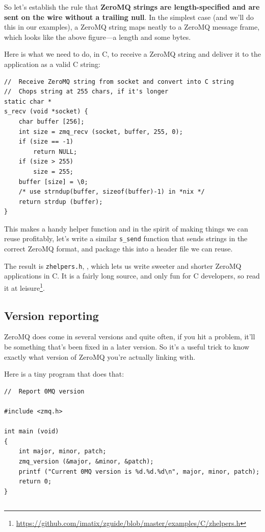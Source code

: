 So let's establish the rule that \textbf{ZeroMQ strings are length-specified and are
sent on the wire without a trailing null}. In the simplest case (and we'll do
this in our examples), a ZeroMQ string maps neatly to a ZeroMQ message frame,
which looks like the above figure—a length and some bytes.

Here is what we need to do, in C, to receive a ZeroMQ string and deliver it to
the application as a valid C string:
\begin{verbatim}
//  Receive ZeroMQ string from socket and convert into C string
//  Chops string at 255 chars, if it's longer
static char *
s_recv (void *socket) {
    char buffer [256];
    int size = zmq_recv (socket, buffer, 255, 0);
    if (size == -1)
        return NULL;
    if (size > 255)
        size = 255;
    buffer [size] = \0;
    /* use strndup(buffer, sizeof(buffer)-1) in *nix */
    return strdup (buffer);
}
\end{verbatim}
This makes a handy helper function and in the spirit of making things we can
reuse profitably, let's write a similar \Verb|s_send| function that sends strings in
the correct ZeroMQ format, and package this into a header file we can reuse.

The result is \Verb|zhelpers.h|, , which lets us write sweeter and shorter ZeroMQ
applications in C. It is a fairly long source, and only fun for C developers,
so read it at leisure\footnote{\url{https://github.com/imatix/zguide/blob/master/examples/C/zhelpers.h}}.

\subsection{Version reporting}

ZeroMQ does come in several versions and quite often, if you hit a problem,
it'll be something that's been fixed in a later version. So it's a useful trick
to know exactly what version of ZeroMQ you're actually linking with.

Here is a tiny program that does that:
\begin{verbatim}
//  Report 0MQ version

#include <zmq.h>

int main (void)
{
    int major, minor, patch;
    zmq_version (&major, &minor, &patch);
    printf ("Current 0MQ version is %d.%d.%d\n", major, minor, patch);
    return 0;
}
\end{verbatim}
\inputminted[baselinestretch=0.8,stripnl=false]{scheme}{../tests/version/version.scm}

